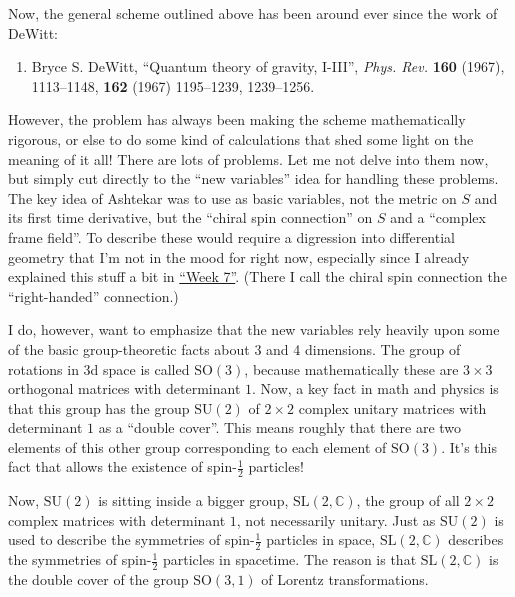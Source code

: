 \documentclass[12pt]{article}
\def\tightlist{}
\begin{document}
Now, the general scheme outlined above has been around ever since the
work of DeWitt:

\begin{enumerate}
\def\labelenumi{\arabic{enumi})}
\tightlist
\item
  Bryce S. DeWitt, ``Quantum theory of gravity, I-III'', \emph{Phys.
  Rev.} \textbf{160} (1967), 1113--1148, \textbf{162} (1967) 1195--1239,
  1239--1256.
\end{enumerate}

However, the problem has always been making the scheme mathematically
rigorous, or else to do some kind of calculations that shed some light
on the meaning of it all! There are lots of problems. Let me not delve
into them now, but simply cut directly to the ``new variables'' idea for
handling these problems. The key idea of Ashtekar was to use as basic
variables, not the metric on \(S\) and its first time derivative, but
the ``chiral spin connection'' on \(S\) and a ``complex frame field''.
To describe these would require a digression into differential geometry
that I'm not in the mood for right now, especially since I already
explained this stuff a bit in \protect\hyperlink{week7}{``Week 7''}.
(There I call the chiral spin connection the ``right-handed''
connection.)

I do, however, want to emphasize that the new variables rely heavily
upon some of the basic group-theoretic facts about 3 and 4 dimensions.
The group of rotations in 3d space is called \(\mathrm{SO}(3)\), because
mathematically these are \(3\times3\) orthogonal matrices with
determinant \(1\). Now, a key fact in math and physics is that this
group has the group \(\mathrm{SU}(2)\) of \(2\times2\) complex unitary
matrices with determinant \(1\) as a ``double cover''. This means
roughly that there are two elements of this other group corresponding to
each element of \(\mathrm{SO}(3)\). It's this fact that allows the
existence of spin-\(\frac12\) particles!

Now, \(\mathrm{SU}(2)\) is sitting inside a bigger group,
\(\mathrm{SL}(2,\mathbb{C})\), the group of all \(2\times2\) complex
matrices with determinant \(1\), not necessarily unitary. Just as
\(\mathrm{SU}(2)\) is used to describe the symmetries of
spin-\(\frac12\) particles in space, \(\mathrm{SL}(2,\mathbb{C})\)
describes the symmetries of spin-\(\frac12\) particles in spacetime. The
reason is that \(\mathrm{SL}(2,\mathbb{C})\) is the double cover of the
group \(\mathrm{SO}(3,1)\) of Lorentz transformations.
\end{document}
